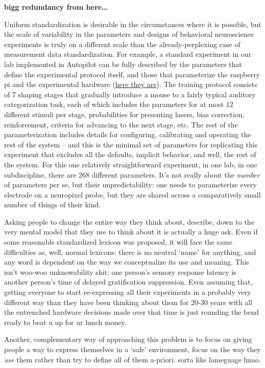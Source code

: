 \documentclass{article}
\begin{document}
\textbf{bigg redundancy from here\ldots{}}

Uniform standardization is desirable in the circumstances where it is
possible, but the scale of variability in the parameters and designs of
behavioral neuroscience experiments is truly on a different scale than
the already-perplexing case of measurement data standardization. For
example, a standard experiment in our lab implemented in Autopilot can
be fully described by the parameters that define the experimental
protocol itself, and those that parameterize the raspberry pi and the
experimental hardware
(\href{https://gist.github.com/sneakers-the-rat/eebe675326a157df49f66f62c4e33a6e}{here
they are}). The training protocol consists of 7 shaping stages that
gradually introduce a mouse to a fairly typical auditory categorization
task, each of which includes the parameters for at most 12 different
stimuli per stage, probabilities for presenting lasers, bias correction,
reinforcement, criteria for advancing to the next stage, etc. The rest
of the parameterization includes details for configuring, calibrating
and operating the rest of the system -- and this is the minimal set of
parameters for replicating this experiment that excludes all the
defaults, implicit behavior, and well, the rest of the system. For this
one relatively straightforward experiment, in one lab, in one
subdiscipline, there are 268 different parameters. It's not really about
the \emph{number} of parameters per se, but their unpredictability: one
needs to parameterize every electrode on a neuropixel probe, but they
are shared across a comparatively small number of things of their kind.

Asking people to change the entire way they think about, describe, down
to the very mental model that they use to think about it is actually a
huge ask. Even if some reasonable standardized lexicon was proposed, it
will face the same difficulties as, well, normal lexicons: there is no
neutral `name' for anything, and any word is dependent on the way we
conceptualize its use and meaning. This isn't woo-woo unknowability
shit: one person's sensory response latency is another person's time of
delayed gratification suppression. Even assuming that, getting everyone
to start re-expressing all their experiments in a probably very
different way than they have been thinking about them for 20-30 years
with all the entrenched hardware decisions made over that time is just
rounding the bend ready to beat u up for ur lunch money.

Another, complementary way of approaching this problem is to focus on
giving people a way to express themselves in a `safe' environment, focus
on the way they \emph{use} them rather than try to define all of them
a-priori. sorta like lameguage lmao.
\end{document}
